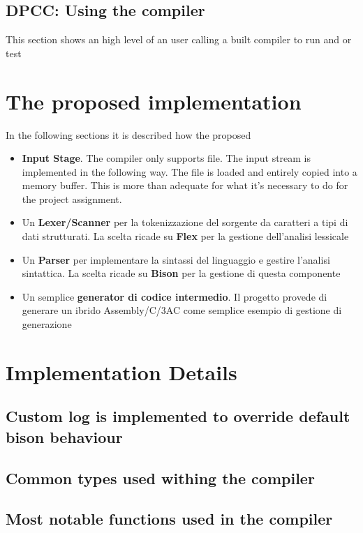 \documentclass[a4paper]{article}
\begin{document}
\subsection{DPCC: Using the compiler}
This section shows an high level of an user calling a built compiler to run and or test


\section{The proposed implementation}
In the following sections it is described how the proposed
\begin{itemize}
\item \textbf{Input Stage}. The compiler only supports file. The input stream is implemented
    in the following way. The file is loaded and entirely copied into a memory buffer. This is more
    than adequate for what it's necessary to do for the project assignment.
\item Un \textbf{Lexer/Scanner} per la tokenizzazione del sorgente da caratteri a tipi di dati strutturati. La scelta ricade su \textbf{Flex} per la gestione dell'analisi lessicale
\item Un \textbf{Parser} per implementare la sintassi del linguaggio e gestire l'analisi sintattica. La scelta ricade su \textbf{Bison} per la gestione di questa componente
\item Un semplice \textbf{generator di codice intermedio}. Il progetto provede di generare un ibrido Assembly/C/3AC come semplice esempio di gestione di generazione
\end{itemize}




\section{Implementation Details}
\subsection{Custom log is implemented to override default bison behaviour}

\subsection{Common types used withing the compiler}


\subsection{Most notable functions used in the compiler}
\end{document}
